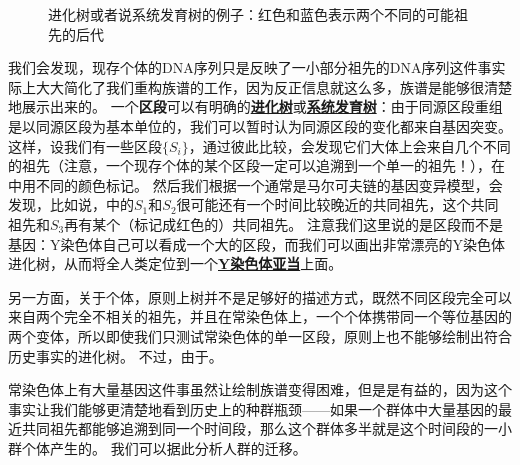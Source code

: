 \documentclass[hyperref, UTF8, a4paper, oneside]{ctexart}
\renewcommand{\emph}[1]{\textbf{#1}}
\newcommand*{\concept}[1]{\underline{\textbf{#1}}}
\numberwithin{equation}{section}
\begin{document}
\begin{figure}
    \centering
    
    \caption{进化树或者说系统发育树的例子：红色和蓝色表示两个不同的可能祖先的后代}
    \label{sec:tree-example}
\end{figure}

我们会发现，现存个体的DNA序列只是反映了一小部分祖先的DNA序列这件事实际上大大简化了我们重构族谱的工作，因为反正信息就这么多，族谱是能够很清楚地展示出来的。
一个\emph{区段}可以有明确的\concept{进化树}或\concept{系统发育树}：由于同源区段重组是以同源区段为基本单位的，我们可以暂时认为同源区段的变化都来自基因突变。
这样，设我们有一些区段$\{S_{i}\}$，通过彼此比较，会发现它们大体上会来自几个不同的祖先（注意，一个现存个体的某个区段一定可以追溯到一个单一的祖先！），在中用不同的颜色标记。
然后我们根据一个通常是马尔可夫链的基因变异模型，会发现，比如说，中的$S_1$和$S_2$很可能还有一个时间比较晚近的共同祖先，这个共同祖先和$S_3$再有某个（标记成红色的）共同祖先。
注意我们这里说的是区段而不是基因：Y染色体自己可以看成一个大的区段，而我们可以画出非常漂亮的Y染色体进化树，从而将全人类定位到一个\concept{Y染色体亚当}上面。

另一方面，关于个体，原则上树并不是足够好的描述方式，既然不同区段完全可以来自两个完全不相关的祖先，并且在常染色体上，一个个体携带同一个等位基因的两个变体，所以即使我们只测试常染色体的单一区段，原则上也不能够绘制出符合历史事实的进化树。
不过，由于。

常染色体上有大量基因这件事虽然让绘制族谱变得困难，但是是有益的，因为这个事实让我们能够更清楚地看到历史上的种群瓶颈——如果一个群体中大量基因的最近共同祖先都能够追溯到同一个时间段，那么这个群体多半就是这个时间段的一小群个体产生的。
我们可以据此分析人群的迁移。
\end{document}
